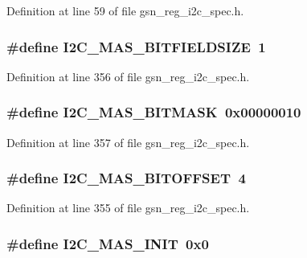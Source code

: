 Definition at line 59 of file gsn\_\-reg\_\-i2c\_\-spec.h.

\hypertarget{a00558_a398c17b70171c09d9a049195df5c21bd}{
\subsubsection[{I2C\_\-MAS\_\-BITFIELDSIZE}]{\setlength{\rightskip}{0pt plus 5cm}\#define I2C\_\-MAS\_\-BITFIELDSIZE~1}}
\label{a00558_a398c17b70171c09d9a049195df5c21bd}


Definition at line 356 of file gsn\_\-reg\_\-i2c\_\-spec.h.

\hypertarget{a00558_a8e267a560fb2b29dfae0923345e8458b}{
\subsubsection[{I2C\_\-MAS\_\-BITMASK}]{\setlength{\rightskip}{0pt plus 5cm}\#define I2C\_\-MAS\_\-BITMASK~0x00000010}}
\label{a00558_a8e267a560fb2b29dfae0923345e8458b}


Definition at line 357 of file gsn\_\-reg\_\-i2c\_\-spec.h.

\hypertarget{a00558_ab0d92e3eb194bc2b5a7e7aa192b97047}{
\subsubsection[{I2C\_\-MAS\_\-BITOFFSET}]{\setlength{\rightskip}{0pt plus 5cm}\#define I2C\_\-MAS\_\-BITOFFSET~4}}
\label{a00558_ab0d92e3eb194bc2b5a7e7aa192b97047}


Definition at line 355 of file gsn\_\-reg\_\-i2c\_\-spec.h.

\hypertarget{a00558_a60afd7872b40ef319ad1041fea20c194}{
\subsubsection[{I2C\_\-MAS\_\-INIT}]{\setlength{\rightskip}{0pt plus 5cm}\#define I2C\_\-MAS\_\-INIT~0x0}}
\label{a00558_a60afd7872b40ef319ad1041fea20c194}


